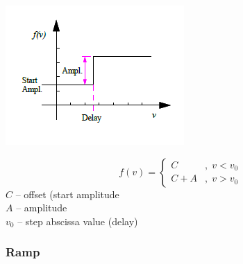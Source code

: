\noindent
\begin{minipage}{0.45\textwidth}
  \includegraphics[width=\textwidth]{Figures/4-Functions_step}
\end{minipage}%
\hfill\begin{minipage}{0.5\textwidth}
  $$
    f(v)=\left\{\begin{array}{ll}
      C   &,\; v < v_0 \\
      C+A &,\; v > v_0
    \end{array}\right.
  $$
  $C$ -- offset (start amplitude \\
  $A$ -- amplitude \\
  $v_0$ -- step abscissa value (delay)
\end{minipage}

\subsubsection{Ramp}

